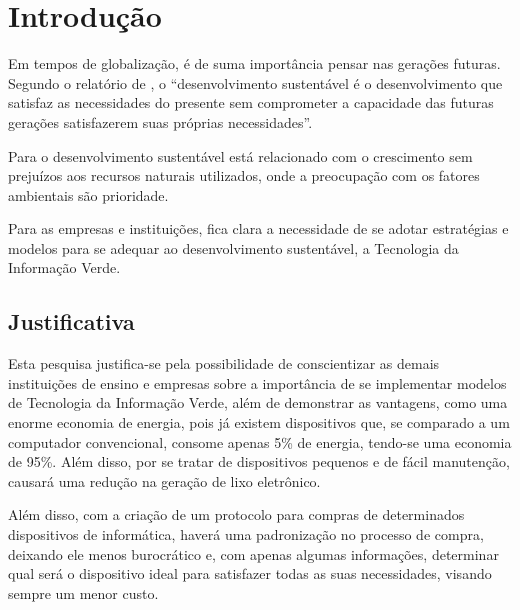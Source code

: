 %
%

\chapter{Introdução}\label{chap:introducao}

Em tempos de globalização, é de suma importância pensar nas gerações futuras. Segundo o relatório de , o “desenvolvimento sustentável é o desenvolvimento que satisfaz as necessidades do presente sem comprometer a capacidade das futuras gerações satisfazerem suas próprias necessidades”. 

Para  o desenvolvimento sustentável está relacionado com o crescimento sem prejuízos aos recursos naturais utilizados, onde a preocupação com os fatores ambientais são prioridade. 

Para as empresas e instituições, fica clara a necessidade de se adotar estratégias e modelos para se adequar ao desenvolvimento sustentável, a Tecnologia da Informação Verde.


\section{Justificativa}
Esta pesquisa justifica-se pela possibilidade de conscientizar as demais instituições de ensino e empresas sobre a importância de se implementar modelos de Tecnologia da Informação Verde, além de demonstrar as vantagens, como uma enorme economia de energia, pois já existem dispositivos que, se comparado a um computador convencional, consome apenas 5\% de energia, tendo-se uma economia de 95\%. Além disso, por se tratar de dispositivos pequenos e de fácil manutenção, causará uma redução na geração de lixo eletrônico.

Além disso, com a criação de um protocolo para compras de determinados dispositivos de informática, haverá uma padronização no processo de compra, deixando ele menos burocrático e, com apenas algumas informações, determinar qual será o dispositivo ideal para satisfazer todas as suas necessidades, visando sempre um menor custo. 


